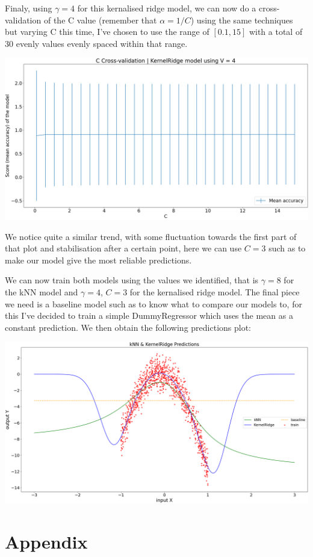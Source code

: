 \documentclass[10pt]{article}
\begin{document}
Finaly, using $\gamma = 4$ for this kernalised ridge model, we can now do a cross-validation of the C value (remember that 
$\alpha = 1 / C$) using the same techniques but varying C this time, I've chosen to use the range of $[0.1, 15]$ with 
a total of 30 evenly values evenly spaced within that range.

\begin{center}
    \includegraphics[scale=0.27]{kridge_crossval_c.png}
\end{center}

We notice quite a similar trend, with some fluctuation towards the first part of that plot and stabilisation
after a certain point, here we can use $C = 3$ such as to make our model give the most reliable predictions.

We can now train both models using the values we identified, that is $\gamma = 8$ for the kNN model and 
$\gamma = 4$, $C = 3$ for the kernalised ridge model. The final piece we need is a baseline model such as to
know what to compare our models to, for this I've decided to train a simple DummyRegressor which uses the mean as a
constant prediction. We then obtain the following predictions plot:

\begin{center}
    \includegraphics[scale=0.27]{optimised.png}
\end{center}


\section*{Appendix}
\end{document}
